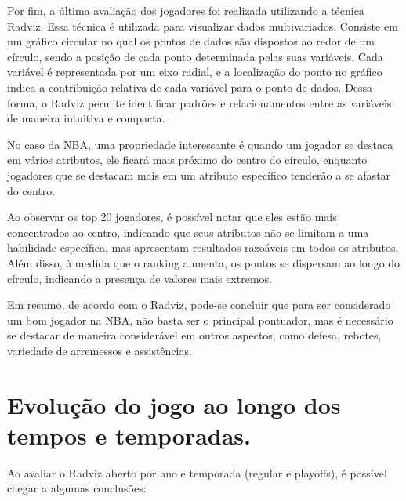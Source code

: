 \documentclass[
]{book}
\begin{document}
Por fim, a última avaliação dos jogadores foi realizada utilizando a técnica Radviz. Essa técnica é utilizada para visualizar dados multivariados. Consiste em um gráfico circular no qual os pontos de dados são dispostos ao redor de um círculo, sendo a posição de cada ponto determinada pelas suas variáveis. Cada variável é representada por um eixo radial, e a localização do ponto no gráfico indica a contribuição relativa de cada variável para o ponto de dados. Dessa forma, o Radviz permite identificar padrões e relacionamentos entre as variáveis de maneira intuitiva e compacta.

No caso da NBA, uma propriedade interessante é quando um jogador se destaca em vários atributos, ele ficará mais próximo do centro do círculo, enquanto jogadores que se destacam mais em um atributo específico tenderão a se afastar do centro.

Ao observar os top 20 jogadores, é possível notar que eles estão mais concentrados ao centro, indicando que seus atributos não se limitam a uma habilidade específica, mas apresentam resultados razoáveis em todos os atributos. Além disso, à medida que o ranking aumenta, os pontos se dispersam ao longo do círculo, indicando a presença de valores mais extremos.

Em resumo, de acordo com o Radviz, pode-se concluir que para ser considerado um bom jogador na NBA, não basta ser o principal pontuador, mas é necessário se destacar de maneira considerável em outros aspectos, como defesa, rebotes, variedade de arremessos e assistências.

\hypertarget{evoluuxe7uxe3o-do-jogo-ao-longo-dos-tempos-e-temporadas.}{%
\chapter{Evolução do jogo ao longo dos tempos e temporadas.}\label{evoluuxe7uxe3o-do-jogo-ao-longo-dos-tempos-e-temporadas.}}

Ao avaliar o Radviz aberto por ano e temporada (regular e playoffs), é possível chegar a algumas conclusões:
\end{document}
